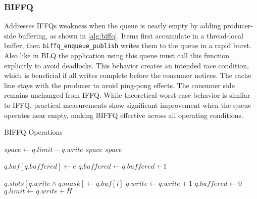 \subsubsection{\acl{BIFFQ}}
Addresses \acsp{IFFQ} weakness when the queue is nearly empty by adding producer-side buffering, as shown in \cref{alg:biffq}. Items first accumulate in a thread-local buffer, then \newline \texttt{biffq\_enqueue\_publish} writes them to the queue in a rapid burst. Also like in \ac{BLQ} the application using this queue must call this function explicitly to avoid deadlocks. This behavior creates an intended race condition, which is beneficial if all writes complete before the consumer notices. The cache line stays with the producer to avoid ping-pong effects. The consumer side remains unchanged from \ac{IFFQ}. While theoretical worst-case behavior is similar to \ac{IFFQ}, practical measurements show significant improvement when the queue operates near empty, making \ac{BIFFQ} effective across all operating conditions. \cite{MaffioneCacheAware}

\begin{algorithm}[!ht]
   \centering
   \captionsetup{justification=centering}
   \caption{\acl{BIFFQ} Operations \cite{MaffioneCacheAware}}
   \label{alg:biffq}
   \scriptsize
   \begin{algorithmic}[1]
           \State $space \gets q.limit - q.write$
               \State \Return $space$ 
           \EndIf
           \State \Return $space$
       \EndFunction
       
       \State
       
           \State $q.buf[q.buffered] \gets e$ 
           \State $q.buffered \gets q.buffered + 1$
       \EndFunction
       
       \State
       
               \State $q.slots[q.write \land q.mask] \gets q.buf[i]$ 
               \State $q.write \gets q.write + 1$
           \EndFor
           \State $q.buffered \gets 0$
           \State $q.limit \gets q.write + H$ 
       \EndFunction
   \end{algorithmic}
\end{algorithm}

